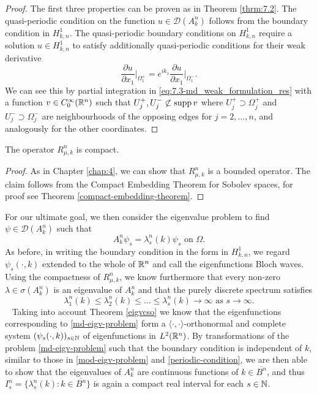 \begin{proof}
 	The first three properties can be proven as in Theorem \ref{thrm:7.2}. The quasi-periodic condition on the function $u \in \mathcal{D}(A^{n}_{k})$ follows from the boundary condition in $H^{1}_{k, n}$. The quasi-periodic boundary conditions on $H^{1}_{k,n}$ require a solution $u \in H^{1}_{k, n}$ to satisfy additionally quasi-periodic conditions for their weak derivative
 		\[ \frac{\partial u}{\partial x_{1}}\big|_{\Omega_{1}^{+}} = e^{ik_{1}} \frac{\partial u}{\partial x_{1}}\big|_{\Omega_{1}^{-}}. \]
 		We can see this by partial integration in \eqref{eq:7.3-md_weak_formulation_res} with a function $v \in C_{0}^{\infty}(\mathbb{R}^{n})$ such that $U^{+}_{j}, U^{-}_{j} \not\subset \operatorname{supp} v$ where $U^{+}_{j} \supset \Omega_{j}^{+}$ and $U^{-}_{j} \supset \Omega_{j}^{-}$ are neighbourhoods of the opposing edges for $j = 2, \dotsc, n$, and analogously for the other coordinates.
\end{proof}

\begin{theorem}
	The operator $R_{\mu, k}^{n}$ is compact.	

	\begin{proof}
		As in Chapter \ref{chap:4}, we can show that $R_{\mu, k}^{n}$ is a bounded operator. The claim follows from the Compact Embedding Theorem for Sobolev spaces, for proof see Theorem \ref{compact-embedding-theorem}.
	\end{proof}
\end{theorem}

For our ultimate goal, we then consider the eigenvalue problem to find $\psi \in \mathcal{D}(A^{n}_{k})$ such that
	\begin{equation}
		A^{n}_{k} \psi_{s} = \lambda^{n}_{s}(k) \psi_{s} \text{ on } \Omega. \label{md-eigv-problem}
	\end{equation}
As before, in writing the boundary condition in the form in $H^{1}_{k, n}$, we regard $\psi_{s}(\cdot, k)$ extended to the whole of $\mathbb{R}^{n}$ and call the eigenfunctions Bloch waves. Using the compactness of $R_{\mu, k}^{n}$, we know furthermore that every non-zero $\lambda \in \sigma(A_{k}^{n})$ is an eigenvalue of $A_{k}^{n}$ and that the purely discrete spectrum satisfies
	\begin{equation}
		\lambda^{n}_{1}(k) \leq \lambda^{n}_{2}(k) \leq \dotsc \leq \lambda^{n}_{s}(k) \rightarrow \infty \text{ as } s \rightarrow \infty. \label{md-comment-after}
	\end{equation}
~\newpage
Taking into account Theorem \ref{eigvcso} we know that the eigenfunctions corresponding to \eqref{md-eigv-problem} form a $\langle \cdot , \cdot \rangle$-orthonormal and complete system $(\psi_{s}(\cdot, k))_{s \in \mathbb{N}}$ of eigenfunctions in $L^{2}(\mathbb{R}^{n})$. By transformations of the problem \eqref{md-eigv-problem} such that the boundary condition is independent of $k$, similar to those in \eqref{mod-eigv-problem} and \eqref{periodic-condition}, we are then able to show that the eigenvalues of $A^{n}_{k}$ are continuous functions of $k \in \overline{B^{n}}$, and thus $I^{n}_{s} = \{ \lambda^{n}_{s}(k) : k \in \overline{B^{n}} \}$ is again a compact real interval for each $s \in \mathbb{N}$.
~\\

